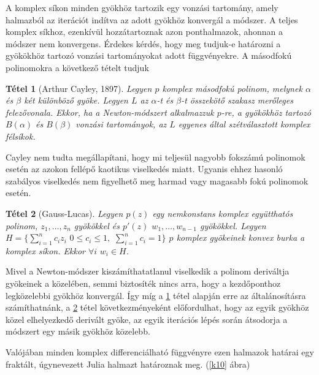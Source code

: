 \documentclass[a4paper,12pt]{report}
\newtheorem{Tet}{Tétel}[section]
\begin{document}
			
			A komplex síkon minden gyökhöz tartozik egy vonzási tartomány, amely halmazból az iterációt indítva az adott gyökhöz konvergál a módszer. A teljes komplex síkhoz, ezenkívül hozzátartoznak azon ponthalmazok, ahonnan a módszer nem konvergens. Érdekes kérdés, hogy meg tudjuk-e határozni a gyökökhöz tartozó vonzási tartományokat adott függvényekre. A másodfokú polinomokra a következő tételt tudjuk
			\begin{Tet}[Arthur Cayley, 1897] \label{Cayley}
				Legyen $p$ komplex másodfokú polinom, melynek $\alpha$ és $\beta$ két különböző gyöke. Legyen $L$ az $\alpha$-t és $\beta$-t összekötő szakasz merőleges felezővonala. Ekkor, ha a Newton-módszert alkalmazzuk $p$-re, a gyökökhöz tartozó $B(\alpha)$ és $B(\beta)$ vonzási tartományok, az $L$ egyenes által szétválasztott komplex félsíkok.
			\end{Tet}
			Cayley nem tudta megállapítani, hogy mi teljesül nagyobb fokszámú polinomok esetén az azokon fellépő kaotikus viselkedés miatt. Ugyanis ehhez hasonló szabályos viselkedés nem figyelhető meg harmad vagy magasabb fokú polinomok esetén.
            
     
			\begin{Tet}[Gauss-Lucas]\label{GL}
				Legyen $p(z)$ egy nemkonstans komplex együtthatós polinom, $z_1,\ldots,z_n$ gyökökkel és $p'(z)$ $w_1,\ldots,w_{n-1}$ gyökökkel. Legyen $H=\{\sum_{i=1}^n c_iz_i\,\,0\leq c_i\leq 1,\,\,\sum_{i=1}^n c_i=1\}$ $p$ komplex gyökeinek konvex burka a komplex síkon. Ekkor $\forall i\,\,w_i\in H$.
			\end{Tet}
Mivel a Newton-módszer kiszámíthatatlanul viselkedik a polinom deriváltja gyökeinek a közelében, semmi biztosíték nincs arra, hogy a kezdőponthoz legközelebbi gyökhöz konvergál. Így míg a \ref{Cayley} tétel alapján erre az általánosításra számíthatnánk, a \ref{GL} tétel következményeként előfordulhat, hogy az egyik gyökhöz közel elhelyezkedő derivált gyöke, az egyik iterációs lépés során átsodorja a módszert egy másik gyökhöz közelebb. 


			Valójában minden komplex differenciálható függvényre ezen halmazok határai egy fraktált, úgynevezett Julia halmazt határoznak meg. (\ref{k10} ábra)
\end{document}
